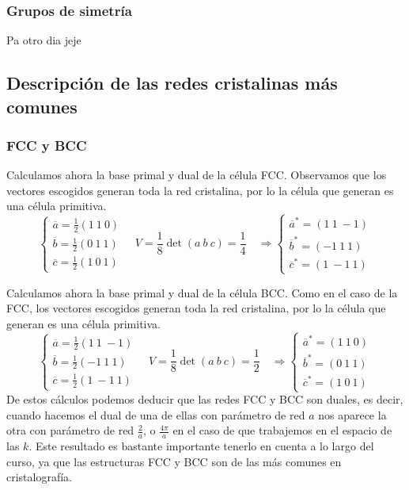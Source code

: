 \documentclass[leqno]{article}
\begin{document}
\subsubsection{Grupos de simetría}
Pa otro dia jeje

\subsection{Descripción de las redes cristalinas más comunes}
\subsubsection{FCC y BCC}
Calculamos ahora la base primal y dual de la célula FCC. Observamos que los vectores escogidos generan toda la red cristalina, por lo la célula que generan es una célula primitiva.
\[
\begin{cases}
  \overline{a} = \frac{1}{2} (1\ 1\ 0) \\
  \overline{b} = \frac{1}{2} (0\ 1\ 1) \\
  \overline{c} = \frac{1}{2} (1\ 0\ 1)
\end{cases} \quad 
V = \frac{1}{8}\det(a\ b\ c) = \frac{1}{4} \quad \Rightarrow
\begin{cases}
  \overline{a}^* = (1\ 1\ -1)\\
  \overline{b}^* = (-1\ 1\ 1 )\\
  \overline{c}^* = (1\ -1\ 1)
\end{cases} 
\] 


Calculamos ahora la base primal y dual de la célula BCC. Como en el caso de la FCC, los vectores escogidos generan toda la red cristalina, por lo la célula que generan es una célula primitiva.
\[
\begin{cases}
  \overline{a} = \frac{1}{2} (1\ 1\ -1) \\
  \overline{b} = \frac{1}{2} (-1\ 1\ 1) \\
  \overline{c} = \frac{1}{2} (1\ -1\ 1)
\end{cases} \quad 
V = \frac{1}{8}\det(a\ b\ c) = \frac{1}{2} \quad \Rightarrow 
\begin{cases}
  \overline{a}^* = (1\ 1\ 0)\\
  \overline{b}^* = (0\ 1\ 1 )\\
  \overline{c}^* = (1\ 0\ 1)
\end{cases} 
\] 
De estos cálculos podemos deducir que las redes FCC y BCC son duales, es decir, cuando hacemos el dual de una de ellas con parámetro de red $a$ nos aparece la otra con parámetro de red  $\frac{2}{a}$, o $\frac{4\pi}{a}$ en el caso de que trabajemos en el espacio de las $k$. Este resultado es bastante importante tenerlo en cuenta a lo largo del curso, ya que las estructuras FCC y  BCC son de las más comunes en cristalografía.
\end{document}
